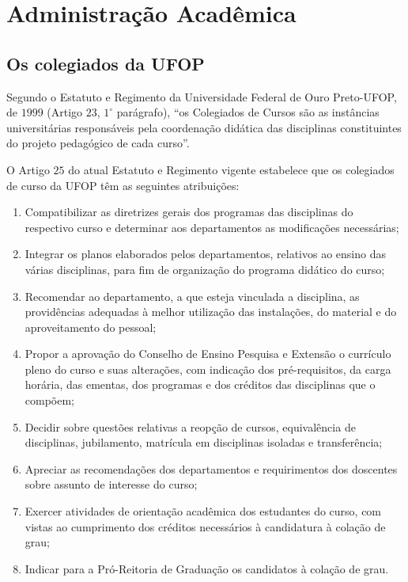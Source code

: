 \chapter{Administra{\c c}{\~a}o Acad{{\^e}mica}}
\label{cap:03} 

\section{Os colegiados da UFOP}
Segundo o Estatuto e Regimento da Universidade Federal de Ouro Preto-UFOP, de $1999$ (Artigo $23$, $ 1^{\circ}$  parágrafo), ``os Colegiados de Cursos são as instâncias universitárias responsáveis pela coordenação didática das disciplinas constituintes do projeto pedagógico de cada curso''.

O Artigo $25$ do atual Estatuto e Regimento vigente estabelece que os colegiados de curso da UFOP têm as seguintes atribuições:
\begin{enumerate}
	\item Compatibilizar as diretrizes gerais dos programas das disciplinas do respectivo curso e determinar aos departamentos as modificações necessárias;
	
	\item Integrar os planos elaborados pelos departamentos, relativos ao ensino das várias disciplinas, para fim de organização do programa didático do curso;
	
	\item Recomendar ao departamento, a que esteja vinculada a disciplina, as providências adequadas à melhor utilização das instalações, do material e do aproveitamento do pessoal;
	
	\item Propor a aprovação do Conselho de Ensino Pesquisa e Extensão o currículo pleno do curso e suas alterações, com indicação dos pré-requisitos, da carga horária, das ementas, dos programas e dos créditos das disciplinas que o compõem;
	
	\item Decidir sobre questões relativas a reopção de cursos, equivalência de disciplinas, jubilamento, matrícula em disciplinas isoladas e transferência;
	
	\item Apreciar as recomendações dos departamentos e requirimentos dos doscentes sobre assunto de interesse do curso;
	
	\item Exercer atividades de orientação acadêmica dos estudantes do curso, com vistas ao cumprimento dos créditos necessários à candidatura à colação de grau;
	
	\item Indicar para a Pró-Reitoria de Graduação os candidatos à colação de grau.
\end{enumerate}


